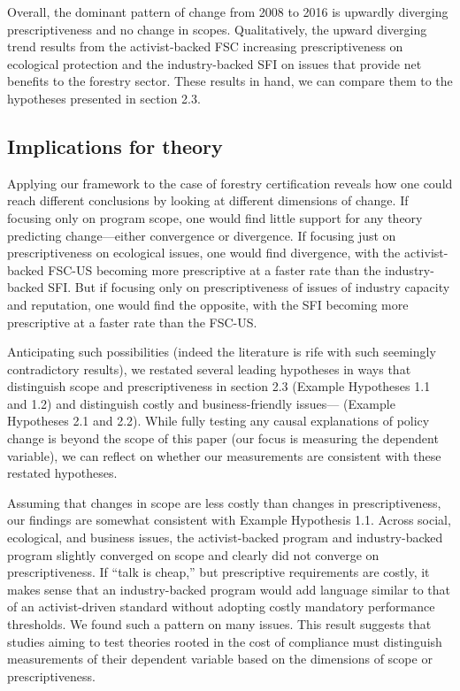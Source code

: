 \documentclass[
      12pt,
            Review ]{article}
\begin{document}
Overall, the dominant pattern of change from 2008 to 2016 is upwardly
diverging prescriptiveness and no change in scopes. Qualitatively, the
upward diverging trend results from the activist-backed FSC increasing
prescriptiveness on ecological protection and the industry-backed SFI on
issues that provide net benefits to the forestry sector. These results
in hand, we can compare them to the hypotheses presented in section 2.3.

\subsection{Implications for theory}\label{implications-for-theory}

Applying our framework to the case of forestry certification reveals how
one could reach different conclusions by looking at different dimensions
of change. If focusing only on program scope, one would find little
support for any theory predicting change---either convergence or
divergence. If focusing just on prescriptiveness on ecological issues,
one would find divergence, with the activist-backed FSC-US becoming more
prescriptive at a faster rate than the industry-backed SFI. But if
focusing only on prescriptiveness of issues of industry capacity and
reputation, one would find the opposite, with the SFI becoming more
prescriptive at a faster rate than the FSC-US.

Anticipating such possibilities (indeed the literature is rife with such
seemingly contradictory results), we restated several leading hypotheses
in ways that distinguish scope and prescriptiveness in section 2.3
(Example Hypotheses 1.1 and 1.2) and distinguish costly and
business-friendly issues--- (Example Hypotheses 2.1 and 2.2). While
fully testing any causal explanations of policy change is beyond the
scope of this paper (our focus is measuring the dependent variable), we
can reflect on whether our measurements are consistent with these
restated hypotheses.

Assuming that changes in scope are less costly than changes in
prescriptiveness, our findings are somewhat consistent with Example
Hypothesis 1.1. Across social, ecological, and business issues, the
activist-backed program and industry-backed program slightly converged
on scope and clearly did not converge on prescriptiveness. If ``talk is
cheap,'' but prescriptive requirements are costly, it makes sense that
an industry-backed program would add language similar to that of an
activist-driven standard without adopting costly mandatory performance
thresholds. We found such a pattern on many issues. This result suggests
that studies aiming to test theories rooted in the cost of compliance
must distinguish measurements of their dependent variable based on the
dimensions of scope or prescriptiveness.
\end{document}
